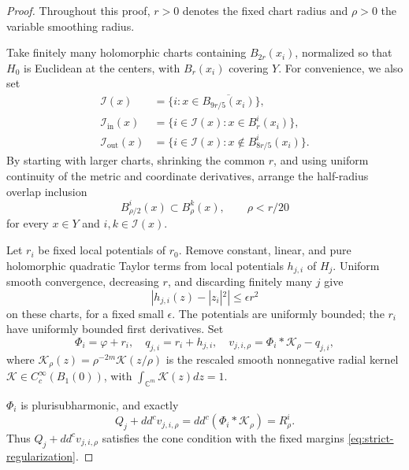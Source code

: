 \documentclass[reqno]{amsart}
\theoremstyle{remark}
\theoremstyle{plain}
\begin{document}
\begin{proof}
Throughout this proof, \(r>0\) denotes the fixed chart radius and \(\rho>0\) the variable smoothing radius. 

Take finitely many holomorphic charts containing \(B_{2r}(x_i)\), normalized so that \(H_0\) is Euclidean at the centers, with \(B_r(x_i)\) covering \(Y\).  For convenience, we also set 
\[
\begin{aligned}
\mathcal I(x)&=\{i: x\in \overline{B_{9r/5}(x_i)}\},    \\
\mathcal I_{\mathrm{in}}(x)
&=\{i\in\mathcal I(x):x\in B_r^i(x_i)\},\\
\mathcal I_{\mathrm{out}}(x)
&=\{i\in\mathcal I(x):x\notin B_{8r/5}^i(x_i)\}.
\end{aligned}
\]
By starting with larger charts, shrinking the common \(r\), and using uniform continuity of the metric and coordinate derivatives, arrange the half-radius overlap inclusion
\begin{equation}\label{eq:overlap}
B^i_{\rho/2}(x)\subset B^k_\rho(x),\qquad \rho<r/20
\end{equation}for every $x\in Y$ and $i,k\in \mathcal{I}(x)$.

Let \(r_i\) be fixed local potentials of \(r_0\). Remove constant, linear, and pure holomorphic quadratic Taylor terms from local potentials \(h_{j,i}\) of \(H_j\). Uniform smooth convergence, decreasing \(r\), and discarding finitely many \(j\) give
\begin{equation}\label{eq:quadratic}
|h_{j,i}(z)-|z_i|^2|\le\epsilon r^2
\end{equation}
on these charts, for a fixed small \(\epsilon\). The potentials are uniformly bounded; the \(r_i\) have uniformly bounded first derivatives. Set
\[
\Phi_i=\varphi+r_i,\quad q_{j,i}=r_i+h_{j,i},\quad
v_{j,i,\rho}=\Phi_i*\mathcal{K}_\rho-q_{j,i},
\]where $\mathcal{K}_\rho(z)=\rho^{-2m}\mathcal{K}(z/\rho)$ is the rescaled smooth nonnegative radial kernel $\mathcal{K}\in C^\infty_c(B_1(0))$, with $\int_{\mathbb{C}^m}\mathcal{K}(z)dz=1$.

$\Phi_i$ is plurisubharmonic, and exactly
\begin{equation}\label{eq:local-class}
Q_j+dd^c v_{j,i,\rho}=dd^c(\Phi_i*\mathcal{K}_\rho)=R_\rho^i.
\end{equation}
Thus $Q_j+dd^cv_{j,i,\rho}$ satisfies the cone condition with the fixed margins \eqref{eq:strict-regularization}.


\end{proof}
\end{document}
